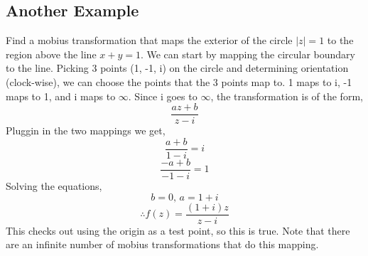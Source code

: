 \documentclass[../main.tex]{subfiles}
\begin{document}
    \subsection{Another Example}
        Find a mobius transformation that maps the exterior of the circle $|z|=1$ to the region above the line $x+y=1$.
        We can start by mapping the circular boundary to the line. Picking 3 points (1, -1, i) on the circle and determining orientation (clock-wise),
        we can choose the points that the 3 points map to. 1 maps to i, -1 maps to 1, and i maps to $\infty$.
        Since i goes to $\infty$, the transformation is of the form,
        $$\frac{az+b}{z-i}$$
        Pluggin in the two mappings we get,
        $$\frac{a+b}{1-i}=i$$
        $$\frac{-a+b}{-1-i}=1$$
        Solving the equations,
        $$b=0\text{, } a=1+i$$
        $$\therefore f(z)=\frac{(1+i)z}{z-i}$$
        This checks out using the origin as a test point, so this is true.
        Note that there are an infinite number of mobius transformations that do this mapping.
    
\end{document}
